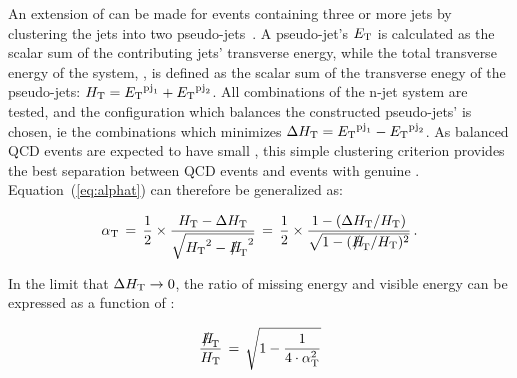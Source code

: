 An extension of \alphat can be made for events containing three or more jets
by clustering the jets into two pseudo-jets~\cite{cms-pas-sus-09001}. 
A pseudo-jet's ${E_{\text T}}$ is calculated as the scalar sum of the contributing 
jets' transverse energy, while the total transverse energy of the system, \scalht, 
is defined as the scalar sum of the transverse enegy of the pseudo-jets: 
$\mbox{$H_\text{T}$} = {E_{\text T}}^{{\rm pj}_1}+{E_{\text T}}^{{\rm pj}_2}$.
All combinations of the n-jet system are tested, and the configuration which
balances the constructed pseudo-jets' \Et is chosen, ie the combinations which
minimizes $\Delta\mbox{$H_\text{T}$} = {E_{\text T}}^{{\rm pj}_1}-{E_{\text T}}^{{\rm pj}_2}$. As balanced QCD events
are expected to have small \dht, this simple clustering criterion provides the best
separation between QCD events and events with genuine \met. 
Equation~(\ref{eq:alphat}) can therefore be generalized as:

\begin{equation}
  \label{eq:alphat2}
  \alphat\, = \,\frac{1}{2} \times \frac{\scalht -
    \dht}{\sqrt{\scalht^2 - \mht^2}} \, = \,\frac{1}{2} \times 
  \frac{1 - (\dht/\scalht)}{\sqrt{1 - (\mht/\scalht)^2}} \, . 
\end{equation}

In the limit that  $\Delta\mbox{$H_\text{T}$} \rightarrow 0$, the ratio of missing energy and
visible energy can be expressed as a function of \alphat:

\begin{equation}
  \label{eq:alphat3}
  \frac{\mht}{\scalht} \, = \, \sqrt{ 1 - \frac{1}{4 \cdot \alphat^2} }
\end{equation}


